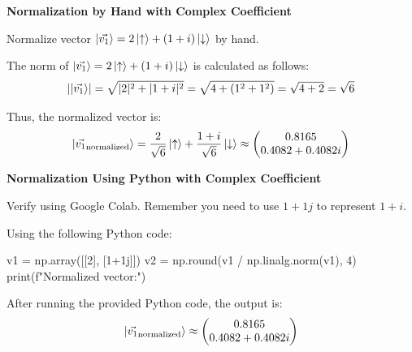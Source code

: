 \documentclass[a4paper, 10pt]{article}
\begin{document}
\begin{problem}
\textbf{Normalization by Hand with Complex Coefficient}
\par Normalize vector \( \ket{\vec{v_1}} = 2\ket{\uparrow} + (1 + i)\ket{\downarrow} \) by hand.
\end{problem}

\begin{solution}
	The norm of \( \ket{\vec{v_1}} = 2\ket{\uparrow} + (1 + i)\ket{\downarrow} \) is calculated as follows:
	\[
		\left|\ket{\vec{v_1}}\right| = \sqrt{|2|^2 + |1 + i|^2} = \sqrt{4 + (1^2 + 1^2)} = \sqrt{4 + 2} = \sqrt{6}
	\]

	Thus, the normalized vector is:
	\[
		\ket{\vec{v_1}_{\text{normalized}}} = \frac{2}{\sqrt{6}} \ket{\uparrow} + \frac{1 + i}{\sqrt{6}} \ket{\downarrow}
		\approx \begin{pmatrix}
			0.8165 \\
			0.4082 + 0.4082i
		\end{pmatrix}
	\]
\end{solution}

\begin{problem}
\textbf{Normalization Using Python with Complex Coefficient}
\par Verify using Google Colab. Remember you need to use \( 1 + 1j \) to represent \( 1 + i \).
\end{problem}

\begin{solution}
	Using the following Python code:
	\begin{codingbox}
v1 = np.array([[2], [1+1j]])
v2 = np.round(v1 / np.linalg.norm(v1), 4)
print(f"Normalized vector:")
\end{codingbox}

	After running the provided Python code, the output is:
	\[
		\ket{\vec{v_1}_{\text{normalized}}} \approx \begin{pmatrix}
			0.8165 \\
			0.4082 + 0.4082i
		\end{pmatrix}
	\]
\end{solution}
\end{document}
